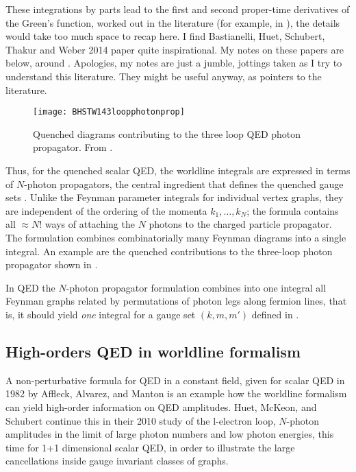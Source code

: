These integrations by parts lead to the first and second proper-time
derivatives of the Green's function, worked out in the literature (for
example, in ), the details would take too
much space to recap here. I find Bastianelli, Huet, Schubert, Thakur and
Weber 2014 paper quite inspirational.
 My notes on these papers are below, around
.
Apologies, my notes are just a jumble, jottings taken as I try to
understand this literature. They might be useful anyway, as pointers to
the literature.

\begin{figure}[h]
\texttt{[image: BHSTW143loopphotonprop]}
 \caption{
 Quenched diagrams contributing to the three loop QED photon propagator.
 From .
 }
 \label{BHSTW143loopphotonprop}
\end{figure}

Thus, for the quenched scalar QED, the worldline integrals are expressed
in terms of $N$-photon propagators, the central ingredient that defines
the quenched gauge sets .
Unlike the Feynman parameter integrals for individual vertex graphs, they are
independent of the ordering of the momenta $k_1,\ldots,k_N$; the formula
 contains all $\approx N!$ ways of attaching the $N$
photons to the charged particle propagator.
The formulation combines combinatorially many Feynman diagrams into a single integral.
An example are the quenched contributions to the
three-loop photon propagator shown in .

In QED the $N$-photon propagator formulation combines into one integral
all Feynman graphs related by permutations of photon legs along fermion
lines, that is, it should yield \emph{one} integral for a gauge set
$(k,m,m')$ defined in .

\subsection{High-orders QED in worldline formalism}
\label{sect:highQEDworldline}

A non-perturbative formula for QED in a constant field, given for scalar
QED in 1982 by Affleck, Alvarez, and Manton is an example how the
worldline formalism can yield high-order information on QED amplitudes.
Huet, McKeon, and Schubert continue this in their 2010
study of the l-electron loop, $N$-photon amplitudes in the limit of large
photon numbers and low photon energies, this time for 1+1 dimensional
scalar QED, in order to illustrate the large cancellations inside gauge
invariant classes of graphs.

